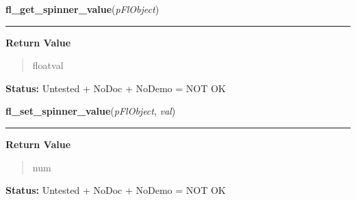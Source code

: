     \label{xformslib:flspinner:fl_get_spinner_value}

    \vspace{0.5ex}

\hspace{.8\funcindent}\begin{boxedminipage}{\funcwidth}

    \raggedright \textbf{fl\_get\_spinner\_value}(\textit{pFlObject})

    \vspace{-1.5ex}

    \rule{\textwidth}{0.5\fboxrule}
\setlength{\parskip}{2ex}
\setlength{\parskip}{1ex}
      \textbf{Return Value}
    \vspace{-1ex}

      \begin{quote}
      floatval

      \end{quote}

\textbf{Status:} Untested + NoDoc + NoDemo = NOT OK



    \end{boxedminipage}

    \label{xformslib:flspinner:fl_set_spinner_value}

    \vspace{0.5ex}

\hspace{.8\funcindent}\begin{boxedminipage}{\funcwidth}

    \raggedright \textbf{fl\_set\_spinner\_value}(\textit{pFlObject}, \textit{val})

    \vspace{-1.5ex}

    \rule{\textwidth}{0.5\fboxrule}
\setlength{\parskip}{2ex}
\setlength{\parskip}{1ex}
      \textbf{Return Value}
    \vspace{-1ex}

      \begin{quote}
      num

      \end{quote}

\textbf{Status:} Untested + NoDoc + NoDemo = NOT OK



    \end{boxedminipage}

